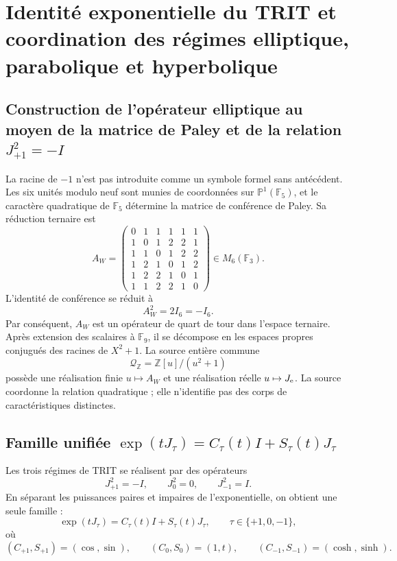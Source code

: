 \label{chap:83-11}

\section{Identité exponentielle du TRIT et coordination des régimes elliptique, parabolique et hyperbolique}

\subsection{Construction de l'opérateur elliptique au moyen de la matrice de Paley et de la relation \texorpdfstring{\(J_{+1}^{2}=-I\)}{J² = -I}}

La racine de \(-1\) n’est pas introduite comme un symbole formel sans antécédent. Les
six unités modulo neuf sont munies de coordonnées sur
\(\mathbb P^1(\mathbb F_5)\), et le caractère quadratique de
\(\mathbb F_5\) détermine la matrice de conférence de Paley. Sa réduction
ternaire est
\[
 A_W=
 \begin{pmatrix}
 0&1&1&1&1&1\\
 1&0&1&2&2&1\\
 1&1&0&1&2&2\\
 1&2&1&0&1&2\\
 1&2&2&1&0&1\\
 1&1&2&2&1&0
 \end{pmatrix}\in M_6(\mathbb F_3).
\]
L’identité de conférence se réduit à
\begin{equation}\label{p12-83-c11-s1:eq:constantes-raiz-interna-menos-uno}
 \boxed{A_W^2=2I_6=-I_6.}
\end{equation}
Par conséquent, \(A_W\) est un opérateur de quart de tour dans l’espace ternaire.
Après extension des scalaires à \(\mathbb F_9\), il se décompose en les espaces
propres conjugués des racines de \(X^2+1\). La source entière commune
\[
 \mathcal Q_{\mathbb Z}=\mathbb Z[u]/(u^2+1)
\]
possède une réalisation finie \(u\mapsto A_W\) et une réalisation réelle
\(u\mapsto J_{\rm e}\). La source coordonne la relation quadratique ; elle n’identifie pas
des corps de caractéristiques distinctes.

\subsection{Famille unifiée \texorpdfstring{\(\exp(tJ_\tau)=C_\tau(t)I+S_\tau(t)J_\tau\)}{exp(t J tau) = C tau(t) I + S tau(t) J tau}}

Les trois régimes de TRIT se réalisent par des opérateurs
\[
 J_{+1}^2=-I,\qquad J_0^2=0,\qquad J_{-1}^2=I.
\]
En séparant les puissances paires et impaires de l’exponentielle, on obtient une
seule famille :
\begin{equation}\label{p12-83-c11-s1:eq:constantes-euler-extendido}
 \boxed{
 \exp(tJ_\tau)=C_\tau(t)I+S_\tau(t)J_\tau,
 \qquad \tau\in\{+1,0,-1\},}
\end{equation}
où
\[
 (C_{+1},S_{+1})=(\cos,\sin),\qquad
 (C_0,S_0)=(1,t),\qquad
 (C_{-1},S_{-1})=(\cosh,\sinh).
\]
